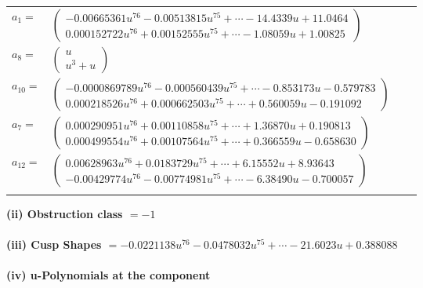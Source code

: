 \documentclass[1p]{elsarticle_modified}
\theoremstyle{definition}
\begin{document}
\begin{tabular}{m{7pt} m{180pt} m{7pt} m{180pt} }
\flushright $a_{1}=$&$\begin{pmatrix}-0.00665361 u^{76}-0.00513815 u^{75}+\cdots-14.4339 u+11.0464\\0.000152722 u^{76}+0.00152555 u^{75}+\cdots-1.08059 u+1.00825\end{pmatrix}$ \\
\flushright $a_{8}=$&$\begin{pmatrix}u\\u^3+u\end{pmatrix}$ \\
\flushright $a_{10}=$&$\begin{pmatrix}-0.0000869789 u^{76}-0.000560439 u^{75}+\cdots-0.853173 u-0.579783\\0.000218526 u^{76}+0.000662503 u^{75}+\cdots+0.560059 u-0.191092\end{pmatrix}$ \\
\flushright $a_{7}=$&$\begin{pmatrix}0.000290951 u^{76}+0.00110858 u^{75}+\cdots+1.36870 u+0.190813\\0.000499554 u^{76}+0.00107564 u^{75}+\cdots+0.366559 u-0.658630\end{pmatrix}$ \\
\flushright $a_{12}=$&$\begin{pmatrix}0.00628963 u^{76}+0.0183729 u^{75}+\cdots+6.15552 u+8.93643\\-0.00429774 u^{76}-0.00774981 u^{75}+\cdots-6.38490 u-0.700057\end{pmatrix}$\\&\end{tabular}
\flushleft \textbf{(ii) Obstruction class $= -1$}\\~\\
\flushleft \textbf{(iii) Cusp Shapes $= -0.0221138 u^{76}-0.0478032 u^{75}+\cdots-21.6023 u+0.388088$}\\~\\
\newpage\renewcommand{\arraystretch}{1}
\flushleft \textbf{(iv) u-Polynomials at the component}\newline \\
\end{document}
